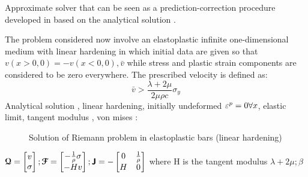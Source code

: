 Approximate solver that can be seen as a prediction-correction procedure developed in \cite{Fogarty} based on the analytical solution \cite{Wang}.

The problem considered now involve an elastoplastic infinite one-dimensional medium with linear hardening in which initial data are given so that $v(x>0,0)=-v(x<0,0),\bar{v}$ while stress and plastic strain components are considered to be zero everywhere. The prescribed velocity is defined as:
\begin{equation}
  \label{eq:Hugoniot_velocity}
  \bar{v}>\frac{\lambda+2\mu}{2\mu \rho c}\sigma_y
\end{equation}
Analytical solution \cite{Thomas_EP}, linear hardening, initially undeformed $\varepsilon^p=0 \forall x$, elastic limit, tangent modulus \cite{Simo}, von mises :
\begin{figure}[h!]
  \centering
  \caption{Solution of Riemann problem in elastoplastic bars (linear hardening)}
  \label{fig:EP_bar_solution}
\end{figure}
${\boldsymbol{\mathcal{Q}}}=\left[\begin{matrix}v \\ \sigma\end{matrix}\right] ;{\boldsymbol{\mathcal{F}}}=\left[\begin{matrix}-\frac{1}{\rho}\sigma \\ -H v\end{matrix}\right] ; \boldsymbol{\mathsf{J}}=-\left[\begin{matrix}0 & \frac{1}{\rho}\\ H& 0 \end{matrix}\right] $ where H is the tangent modulus $\lambda+2\mu ; \beta$

